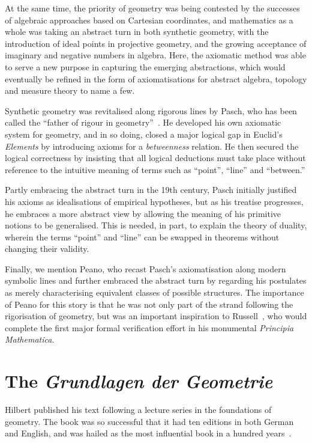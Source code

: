 At the same time, the priority of geometry was being contested by the successes of algebraic approaches based on Cartesian coordinates, and mathematics as a whole was taking an abstract turn in both synthetic geometry, with the introduction of ideal points in projective geometry, and the growing acceptance of imaginary and negative numbers in algebra. Here, the axiomatic method was able to serve a new purpose in capturing the emerging abstractions, which would eventually be refined in the form of axiomatisations for abstract algebra, topology and measure theory to name a few.

Synthetic geometry was revitalised along rigorous lines by Pasch, who has been called the ``father of rigour in geometry''~\cite{PaschToPeano}. He developed his own axiomatic system for geometry, and in so doing, closed a major logical gap in Euclid's \emph{Elements} by introducing axioms for a \emph{betweenness} relation. He then secured the logical correctness by insisting that all logical deductions must take place without reference to the intuitive meaning of terms such as ``point'', ``line'' and ``between.'' 

Partly embracing the abstract turn in the 19th century, Pasch initially justified his axioms as idealisations of empirical hypotheses, but as his treatise progresses, he embraces a more abstract view by allowing the meaning of his primitive notions to be generalised. This is needed, in part, to explain the theory of duality, wherein the terms ``point'' and ``line'' can be swapped in theorems without changing their validity.

Finally, we mention Peano, who recast Pasch's axiomatisation along modern symbolic lines and further embraced the abstract turn by regarding his postulates as merely characterising equivalent classes of possible structures. The importance of Peano for this story is that he was not only part of the strand following the rigorisation of geometry, but was an important inspiration to Russell~\cite{PrinciplesOfMathematics}, who would complete the first major formal verification effort in his monumental \emph{Principia Mathematica}. 

\section{The \emph{Grundlagen der Geometrie}}
Hilbert published his text following a lecture series in the foundations of geometry. The book was so successful that it had ten editions in both German and English, and was hailed as the most influential book in a hundred years~\cite{BirkhoffHilbertInfluence}. 

